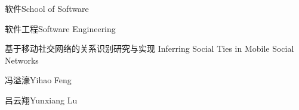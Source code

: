 
\school
{软件}{School of Software}

\major
{软件工程}{Software Engineering}

\thesistitle
{基于移动社交网络的关系识别研究与实现}
{}
{Inferring Social Ties in Mobile Social Networks}
{}

\thesisauthor
{冯溢濠}{Yihao Feng}

\teacher
{吕云翔}{Yunxiang Lu}






